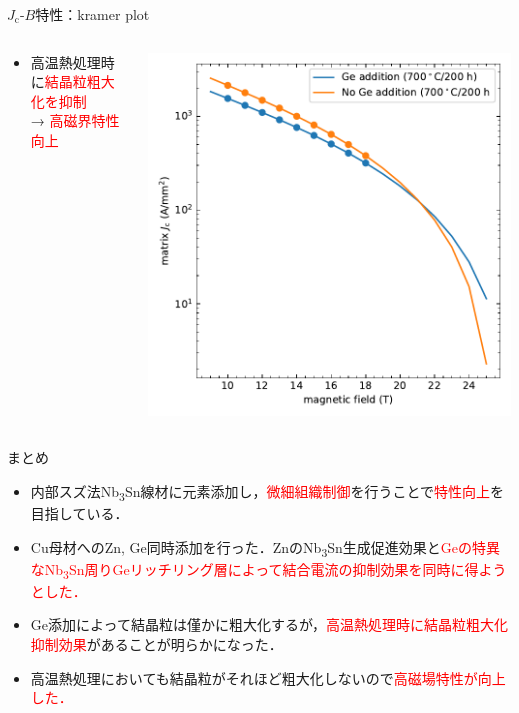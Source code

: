 \documentclass[aspectratio=169, unicode, 10pt]{beamer}
\begin{document}
	\begin{frame}{$J_\mathrm{c}$-$B$特性：kramer plot}
		\begin{columns}
			\begin{column}{0.45\linewidth}
				\begin{itemize}
					\item 高温熱処理時に\textcolor{red}{結晶粒粗大化を抑制} \\
						→ \textcolor{red}{高磁界特性向上}
				\end{itemize}
			\end{column}
			\begin{column}{0.55\linewidth}
				\centering
				\includegraphics[width=0.9\linewidth]{figs/kramerout.pdf}
			\end{column}
		\end{columns}
	\end{frame}

	\begin{frame}{まとめ}
		\begin{itemize}
			\item 内部スズ法Nb\textsubscript{3}Sn線材に元素添加し，\textcolor{red}{微細組織制御}を行うことで\textcolor{red}{特性向上}を目指している．
			\item Cu母材へのZn, Ge同時添加を行った．ZnのNb\textsubscript{3}Sn生成促進効果と\textcolor{red}{Geの特異なNb\textsubscript{3}Sn周りGeリッチリング層によって結合電流の抑制効果を同時に得ようとした．}
			\item Ge添加によって結晶粒は僅かに粗大化するが，\textcolor{red}{高温熱処理時に結晶粒粗大化抑制効果}があることが明らかになった．
			\item 高温熱処理においても結晶粒がそれほど粗大化しないので\textcolor{red}{高磁場特性が向上した．}
		\end{itemize}
	\end{frame}
\end{document}
